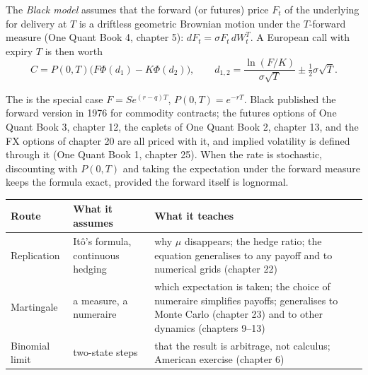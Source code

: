 \begin{definition}\label{def:dv:black-scholes-three-ways:black}
The \emph{Black model} assumes that the forward (or futures)
price $F_t$ of the underlying for delivery at $T$ is a driftless geometric
Brownian motion under the $T$-forward measure (One Quant Book 4, chapter 5):
$dF_t=\sigma F_t\,dW^T_t$. A European call with expiry $T$ is then worth
\[
C=P(0,T)\bigl(F\Phi(d_1)-K\Phi(d_2)\bigr),\qquad d_{1,2}=\frac{\ln(F/K)}{\sigma\sqrt T}\pm\tfrac12\sigma\sqrt T .
\]
\end{definition}

The  is the special case $F=Se^{(r-q)T}$,
$P(0,T)=e^{-rT}$. Black published the forward version in 1976 for commodity
contracts; the futures options of One Quant Book 3, chapter 12, the caplets of
One Quant Book 2, chapter 13, and the FX options of chapter 20 are all priced
with it, and implied volatility is defined through it (One Quant Book 1,
chapter 25). When the rate is stochastic, discounting with $P(0,T)$ and taking
the expectation under the forward measure keeps the formula exact, provided the
forward itself is lognormal.

\begin{center}
\footnotesize
\begin{tabular}{@{}p{2.4cm}p{4.9cm}p{5.4cm}@{}}
\toprule
Route & What it assumes & What it teaches \\
\midrule
Replication & Itô's formula, continuous hedging & why $\mu$ disappears; the hedge ratio; the equation generalises to any payoff and to numerical grids (chapter 22) \\
Martingale & a measure, a numeraire & which expectation is taken; the choice of numeraire simplifies payoffs; generalises to Monte Carlo (chapter 23) and to other dynamics (chapters 9--13) \\
Binomial limit & two-state steps & that the result is arbitrage, not calculus; American exercise (chapter 6) \\
\bottomrule
\end{tabular}
\end{center}

